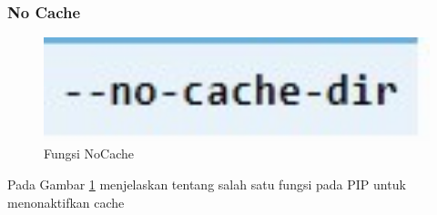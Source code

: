 \documentclass[12pt,a4paper]{article}
\begin{document}
\begin{itemize}
\subsubsection{No Cache}
\begin{figure}[h]
\begin{center}
\includegraphics[width=1\textwidth]{../figures/1nocache.jpg} 
\caption{Fungsi NoCache}
\label{fungsinocache}
\end{center}
\end{figure}
Pada Gambar \ref{fungsinocache} menjelaskan tentang salah satu fungsi pada PIP untuk menonaktifkan cache
\end{itemize}
\end{document}
